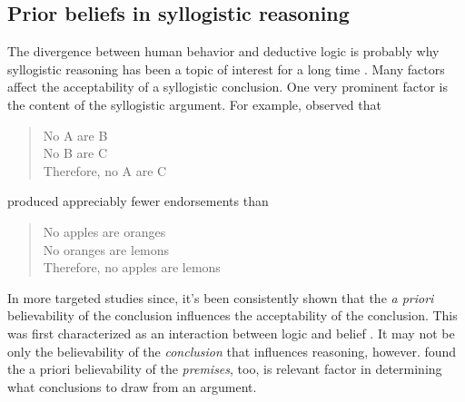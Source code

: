 \documentclass{llncs} %
\begin{document}
\subsection{Prior beliefs in syllogistic reasoning}

The divergence between human behavior and deductive logic is probably why syllogistic reasoning has been a topic of interest for a long time \cite{Storring1908,Woodworth1935, Chapman1959, JL1978, Chater1999}. Many factors affect the acceptability of a syllogistic conclusion. One very prominent factor is the content of the syllogistic argument. For example,  observed that

\begin{quote}
No A are B\\
No B are C\\
Therefore, no A are C
\end{quote}

produced appreciably fewer endorsements than 

\begin{quote}
No apples are oranges\\
No oranges are lemons\\
Therefore, no apples are lemons
\end{quote}

In more targeted studies since, it's been consistently shown that the \emph{a priori} believability of the conclusion influences the acceptability of the conclusion. This was first characterized as an interaction between logic and belief \cite{Evans1983}. It may not be only the believability of the \emph{conclusion} that influences reasoning, however.  found the a priori believability of the \emph{premises}, too, is relevant factor in determining what conclusions to draw from an argument. 

\end{document}
